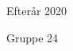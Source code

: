 \begin{titlepage}
\begin{center}
\begin{center}
\end{center}

Efterår 2020

\vspace{0.1cm}

Gruppe 24
\end{center}
\end{titlepage}